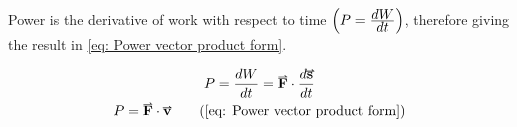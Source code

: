 \documentclass[main.tex]{subfiles}
\begin{document}
                    Power is the derivative of work with respect to time $\left(P = \frac{\displaystyle dW}{\displaystyle dt}\right)$, therefore giving the result in \eqref{eq: Power vector product form}.

                    \begin{gather*}
                        P = \frac{dW}{dt} = \vect{F} \cdot \frac{d\vect{s}}{dt}\\
                        P = \vect{F} \cdot \vect{v} \tag{\eqnum{eq: Power vector product form}}
                    \end{gather*}
                    
\end{document}
